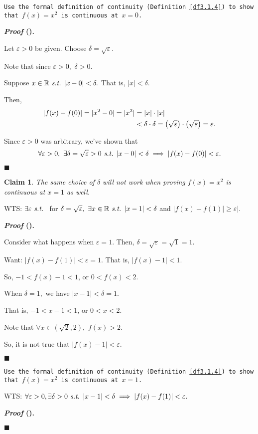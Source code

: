 \documentclass[12pt,a4paper]{article}
\newtheorem{clm}{Claim}[subsection]
\newcounter{nprf}[subsection]
\newenvironment*{prf}{\par\indent\textbf{\textit{Proof} (\stepcounter{nprf}\thenprf). }\par }{\par\hfill $\blacksquare$\par}
\def\R{{\mathbb{R}}}
\def\epsilon{\varepsilon}
\def\st{\emph{ s.t. }}
\begin{document}
\begin{framed}
\noindent\texttt{Use the formal definition of continuity (Definition \ref{df3.1.4}) to show that $f(x)=x^2$ is continuous at $x=0$.}
\begin{prf}
	Let $\varepsilon>0$ be given. Choose $\delta=\sqrt{\varepsilon}.$\par Note that since $\varepsilon>0,$ $\delta>0.$\par Suppose $x\in\R\st|x-0|<\delta.$ That is, $|x|<\delta.$\par Then, \[\begin{aligned}
		|f(x)-f(0)|=|x^2-0|=|x^2|&=|x|\cdot|x|\\&<\delta\cdot\delta=\qty(\sqrt{\varepsilon})\cdot\qty(\sqrt{\varepsilon})=\varepsilon.\end{aligned}\]\par Since $\varepsilon>0$ was arbitrary, we've shown that \[\forall\varepsilon>0,\ \exists\delta=\sqrt{\varepsilon}>0\st|x-0|<\delta\implies|f(x)-f(0)|<\varepsilon.\]	
\end{prf}
\begin{clm}
	The same choice	of $\delta$ will not work when proving $f(x)=x^2$ is continuous at $x=1$ as well.
\end{clm}
\begin{center}
WTS: $\exists\epsilon\st$ for $\delta=\sqrt{\epsilon},\ \exists x\in\R\st|x-1|<\delta$ and $|f(x)-f(1)|\geq\epsilon|.$
\end{center}
\begin{prf}
	Consider what happens when $\epsilon=1.$ Then, $\delta=\sqrt{\epsilon}=\sqrt{1}=1.$\par Want: $|f(x)-f(1)|<\epsilon=1.$ That is, $|f(x)-1|<1.$\par So, $-1<f(x)-1<1$, or $0<f(x)<2.$\par When $\delta=1,$ we have $|x-1|<\delta=1.$\par That is, $-1<x-1<1$, or $0<x<2$.\par Note that $\forall x\in(\sqrt{2},2),$ $f(x)>2.$\par So, it is not true that $|f(x)-1|<\epsilon.$
\end{prf}
\texttt{Use the formal definition of continuity (Definition \ref{df3.1.4}) to show that $f(x)=x^2$ is continuous at $x=1$.}
\begin{center}
WTS: $\forall\epsilon>0,\exists\delta>0\st |x-1|<\delta\implies|f(x)-f(1)|<\epsilon.$	
\end{center}
\begin{prf}

\end{prf}
\end{framed}
\end{document}
